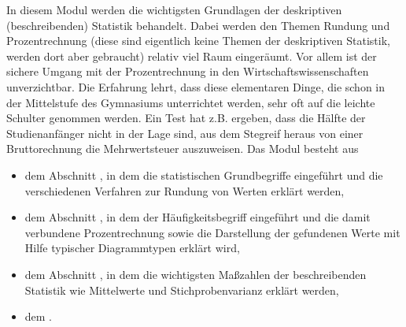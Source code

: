 
\Mtikzexternalize




\begin{MSectionStart}

In diesem Modul werden die wichtigsten Grundlagen der deskriptiven (beschreibenden) Statistik behandelt.
Dabei werden den Themen Rundung und Prozentrechnung (diese sind eigentlich keine Themen der deskriptiven Statistik,
werden dort aber gebraucht) relativ viel Raum eingeräumt. Vor allem ist der sichere Umgang mit der Prozentrechnung in den Wirtschaftswissenschaften
unverzichtbar. Die Erfahrung lehrt, dass diese elementaren Dinge, die schon in der Mittelstufe des Gymnasiums unterrichtet werden, sehr oft auf die leichte
Schulter genommen werden. Ein Test hat z.B. ergeben, dass die Hälfte der Studienanfänger nicht in der Lage sind, aus dem Stegreif heraus von einer
Bruttorechnung die Mehrwertsteuer auszuweisen. Das Modul besteht aus

\begin{itemize}
\item{dem Abschnitt , in dem die statistischen Grundbegriffe eingeführt und die verschiedenen Verfahren zur Rundung von Werten erklärt werden,}
\item{dem Abschnitt , in dem der Häufigkeitsbegriff eingeführt und die damit verbundene
Prozentrechnung sowie die Darstellung der gefundenen Werte mit Hilfe typischer Diagrammtypen erklärt wird,}
\item{dem Abschnitt , in dem die wichtigsten Maßzahlen der beschreibenden Statistik wie Mittelwerte und Stichprobenvarianz erklärt werden,}
\item{dem .}
\end{itemize}

\end{MSectionStart}



